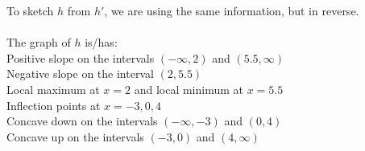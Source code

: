 \documentclass[nooutcomes,handout]{ximera}
\begin{document}
\begin{problem}
\begin{freeResponse}
To sketch $h$ from $h'$, we are using the same information, but in reverse.  \\\\
The graph of $h$ is/has:\\
Positive slope on the intervals $(-\infty,2)$ and $(5.5,\infty)$\\
Negative slope on the interval $(2,5.5)$\\
Local maximum at $x=2$ and local minimum at $x=5.5$\\
Inflection points at $x=-3,0,4$\\
Concave down on the intervals  $(-\infty,-3)$ and $(0,4)$\\
Concave up on the intervals $(-3,0)$ and $(4,\infty)$


		
						
\end{freeResponse}
\end{problem}
\end{document}
